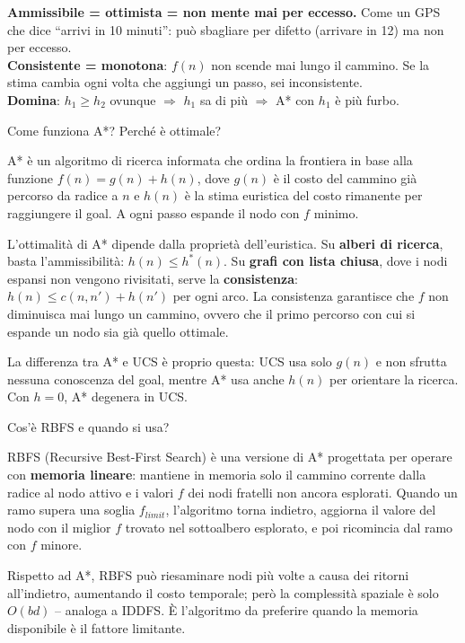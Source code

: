 \documentclass[12pt,a4paper]{article}
\begin{document}
\begin{ricordabox}
\textbf{Ammissibile = ottimista = non mente mai per eccesso.} Come un GPS che dice ``arrivi in 10 minuti'': può sbagliare per difetto (arrivare in 12) ma non per eccesso.\\[3pt]
\textbf{Consistente = monotona}: $f(n)$ non scende mai lungo il cammino. Se la stima cambia ogni volta che aggiungi un passo, sei inconsistente.\\[3pt]
\textbf{Domina}: $h_1 \geq h_2$ ovunque $\Rightarrow$ $h_1$ sa di più $\Rightarrow$ A* con $h_1$ è più furbo.
\end{ricordabox}

\begin{domandabox}{Come funziona A*? Perché è ottimale?}
\end{domandabox}

A* è un algoritmo di ricerca informata che ordina la frontiera in base alla funzione $f(n) = g(n) + h(n)$, dove $g(n)$ è il costo del cammino già percorso da radice a $n$ e $h(n)$ è la stima euristica del costo rimanente per raggiungere il goal. A ogni passo espande il nodo con $f$ minimo.

L'ottimalità di A* dipende dalla proprietà dell'euristica. Su \textbf{alberi di ricerca}, basta l'ammissibilità: $h(n) \leq h^*(n)$. Su \textbf{grafi con lista chiusa}, dove i nodi espansi non vengono rivisitati, serve la \textbf{consistenza}: $h(n) \leq c(n,n') + h(n')$ per ogni arco. La consistenza garantisce che $f$ non diminuisca mai lungo un cammino, ovvero che il primo percorso con cui si espande un nodo sia già quello ottimale.

La differenza tra A* e UCS è proprio questa: UCS usa solo $g(n)$ e non sfrutta nessuna conoscenza del goal, mentre A* usa anche $h(n)$ per orientare la ricerca. Con $h = 0$, A* degenera in UCS.

\begin{domandabox}{Cos'è RBFS e quando si usa?}
\end{domandabox}

RBFS (Recursive Best-First Search) è una versione di A* progettata per operare con \textbf{memoria lineare}: mantiene in memoria solo il cammino corrente dalla radice al nodo attivo e i valori $f$ dei nodi fratelli non ancora esplorati. Quando un ramo supera una soglia $f_{limit}$, l'algoritmo torna indietro, aggiorna il valore del nodo con il miglior $f$ trovato nel sottoalbero esplorato, e poi ricomincia dal ramo con $f$ minore.

Rispetto ad A*, RBFS può riesaminare nodi più volte a causa dei ritorni all'indietro, aumentando il costo temporale; però la complessità spaziale è solo $O(bd)$ -- analoga a IDDFS. È l'algoritmo da preferire quando la memoria disponibile è il fattore limitante.
\end{document}
